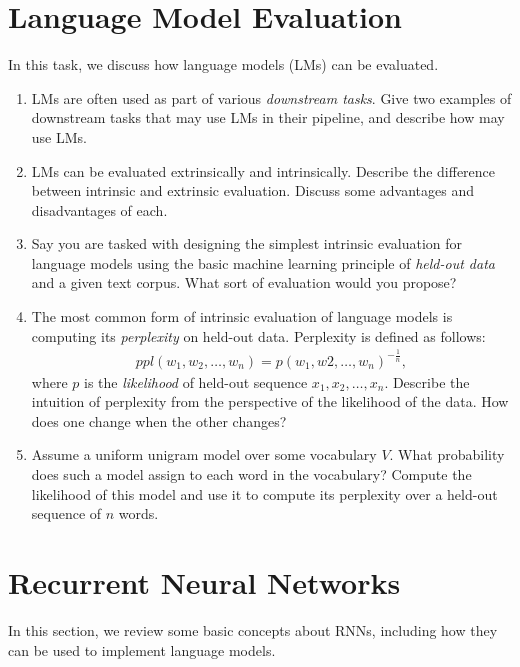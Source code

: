 \documentclass[11pt,a4paper]{article}
\begin{document}
\newpage
\section{Language Model Evaluation}

In this task, we discuss how language models (LMs) can be evaluated.

\begin{enumerate}[label=(\alph*)]
    \item LMs are often used as part of various \emph{downstream tasks}.
          Give two examples of downstream tasks that may use LMs in their
          pipeline, and describe how may use LMs.
    \item LMs can be evaluated extrinsically and intrinsically.
          Describe the difference between intrinsic and extrinsic evaluation.
          Discuss some advantages and disadvantages of each.
    \item Say you are tasked with designing the simplest
          intrinsic evaluation for language models using the basic machine
          learning principle of \emph{held-out data} and a given text
          corpus.
          What sort of evaluation would you propose?
    \item The most common form of intrinsic evaluation of language models is
          computing its \emph{perplexity} on held-out data.
          Perplexity is defined as follows:
          \begin{align*}
              ppl(w_1,w_2,\ldots,w_n) = p(w_1,w2,\ldots,w_n)^{-\frac{1}{n}},
          \end{align*}
          where $p$ is the \emph{likelihood} of held-out sequence
          $x_1, x_2, \ldots, x_n$.
          Describe the intuition of perplexity from the perspective of the
          likelihood of the data. How does one change when the other changes?
    \item Assume a uniform unigram model over some vocabulary $V$. What
          probability does such a model assign to each word in the vocabulary?
          Compute the likelihood of this model and use it to compute its
          perplexity over a held-out sequence of $n$ words.
\end{enumerate}

\section{Recurrent Neural Networks}

In this section, we review some basic concepts about RNNs, including how they
can be used to implement language models.
\end{document}
